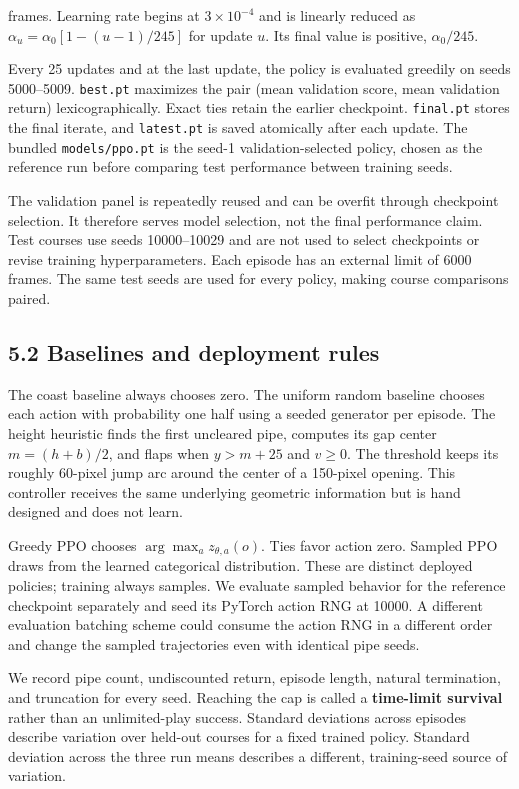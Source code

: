 \documentclass[
  11pt,
]{article}
\begin{document}
frames. Learning rate begins at \(3\times10^{-4}\) and is linearly
reduced as \(\alpha_u=\alpha_0[1-(u-1)/245]\) for update \(u\). Its
final value is positive, \(\alpha_0/245\).

Every 25 updates and at the last update, the policy is evaluated
greedily on seeds 5000--5009. \texttt{best.pt} maximizes the pair (mean
validation score, mean validation return) lexicographically. Exact ties
retain the earlier checkpoint. \texttt{final.pt} stores the final
iterate, and \texttt{latest.pt} is saved atomically after each update.
The bundled \texttt{models/ppo.pt} is the seed-1 validation-selected
policy, chosen as the reference run before comparing test performance
between training seeds.

The validation panel is repeatedly reused and can be overfit through
checkpoint selection. It therefore serves model selection, not the final
performance claim. Test courses use seeds 10000--10029 and are not used
to select checkpoints or revise training hyperparameters. Each episode
has an external limit of 6000 frames. The same test seeds are used for
every policy, making course comparisons paired.

\subsection{5.2 Baselines and deployment
rules}\label{baselines-and-deployment-rules}

The coast baseline always chooses zero. The uniform random baseline
chooses each action with probability one half using a seeded generator
per episode. The height heuristic finds the first uncleared pipe,
computes its gap center \(m=(h+b)/2\), and flaps when \(y>m+25\) and
\(v\ge0\). The threshold keeps its roughly 60-pixel jump arc around the
center of a 150-pixel opening. This controller receives the same
underlying geometric information but is hand designed and does not
learn.

Greedy PPO chooses \(\arg\max_a z_{\theta,a}(o)\). Ties favor action
zero. Sampled PPO draws from the learned categorical distribution. These
are distinct deployed policies; training always samples. We evaluate
sampled behavior for the reference checkpoint separately and seed its
PyTorch action RNG at 10000. A different evaluation batching scheme
could consume the action RNG in a different order and change the sampled
trajectories even with identical pipe seeds.

We record pipe count, undiscounted return, episode length, natural
termination, and truncation for every seed. Reaching the cap is called a
\textbf{time-limit survival} rather than an unlimited-play success.
Standard deviations across episodes describe variation over held-out
courses for a fixed trained policy. Standard deviation across the three
run means describes a different, training-seed source of variation.
\end{document}
